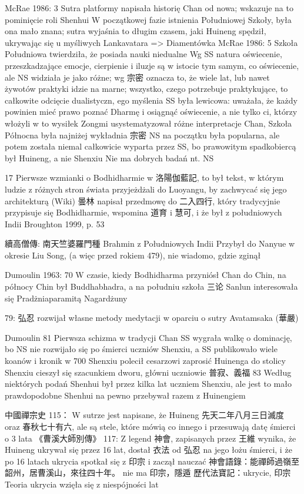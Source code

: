 McRae 1986: 3
Sutra platformy napisała historię Chan od nowa; wskazuje na to pominięcie roli Shenhui
W początkowej fazie istnienia Południowej Szkoły, była ona mało znana; sutra wyjaśnia to długim czasem, jaki Huineng spędził, ukrywając się u myśliwych
Lankavatara => Diamentówka
McRae 1986: 5
Szkoła Południowa twierdziła, że posiada nauki niedualne
Wg SS natura oświecenie, przeszkadzające emocje, cierpienie i iluzje są w istocie tym samym, co oświecenie, ale NS widziała je jako różne; wg 宗密 oznacza to, że wiele lat, lub nawet żywotów praktyki idzie na marne; wszystko, czego potrzebuje praktykujące, to całkowite odcięcie dualistyczn, ego myślenia
SS była lewicowa: uważała, że każdy powinien mieć prawo poznać Dharmę i osiągnąć oświecenie, a nie tylko ci, którzy włożyli w to wysiłek
Zongmi usystematyzował różne interpretacje Chan, Szkoła Północna była najniżej
wykładnia 宗密 NS na początku była popularna, ale potem została niemal całkowicie wyparta przez SS, bo prawowitym spadkobiercą był Huineng, a nie Shenxiu
Nie ma dobrych badań nt. NS

17 Pierwsze wzmianki o Bodhidharmie w 洛陽伽藍記, to był tekst, w którym ludzie z różnych stron świata przyjeżdżali do Luoyangu, by zachwycać się jego architekturą
(Wiki) 曇林 napisał przedmowę do 二入四行, który tradycyjnie przypisuje się Bodhidharmie, wspomina 道育 i 慧可, i że był z południowych Indii Broughton 1999, p. 53

續高僧傳:
南天竺婆羅門種 Brahmin z Południowych Indii
Przybył do Nanyue w okresie Liu Song, (a więc przed rokiem 479), nie wiadomo, gdzie zginął

Dumoulin 1963: 70
W czasie, kiedy Bodhidharma przyniósł Chan do Chin, na północy Chin był Buddhabhadra, a na południu szkoła 三论
Sanlun interesowała się Pradżniaparamitą Nagardżuny

79: 弘忍 rozwijał własne metody medytacji w oparciu o sutry Avatamsaka (華嚴)

Dumoulin 81
Pierwsza schizma w tradycji Chan
SS wygrała walkę o dominację, bo NS nie rozwijało się po śmierci uczniów Shenxiu, a SS publikowało wiele koanów i kronik
w 700 Shenxiu polecił cesarzowi zaprosić Huinenga do stolicy
Shenxiu cieszył się szacunkiem dworu, główni uczniowie 普寂、義福
83
Według niektórych podań Shenhui był przez kilka lat uczniem Shenxiu, ale jest to mało prawdopodobne
Shenhui na pewno przebywał razem z Huinengiem

中國禪宗史 115：
W sutrze jest napisane, że Huineng 先天二年八月三日滅度 oraz 春秋七十有六, ale są stele, które mówią co innego i przesuwają datę śmierci o 3 lata
《曹溪大師別傳》
117: Z legend 神會, zapisanych przez 王維 wynika, że Huineng ukrywał się przez 16 lat, dostał 衣法 od 弘忍 na jego łożu śmierci, i że po 16 latach ukrycia spotkał się z 印宗 i zaczął nauczać
神會語錄：能禪師過嶺至韶州，居曹溪山，來往四十年。 nie ma 印宗，隱遁
歷代法寶記：ukrycie, 印宗
Teoria ukrycia wzięła się z niespójności lat
\fi
